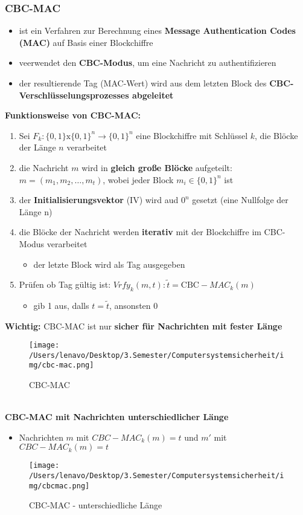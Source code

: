 \documentclass[a4paper, 10pt]{article}
\begin{document}
\subsubsection{CBC-MAC}
\begin{itemize}
    \item ist ein Verfahren zur Berechnung eines \textbf{Message Authentication Codes (MAC)} auf Basis einer Blockchiffre
    \item veerwendet den \textbf{CBC-Modus}, um eine Nachricht zu authentifizieren
    \item der resultierende Tag (MAC-Wert) wird aus dem letzten Block des \textbf{CBC-Verschlüsselungsprozesses abgeleitet}
\end{itemize}
\textbf{Funktionsweise von CBC-MAC:}
\begin{enumerate}
    \item Sei $F_k: \{0,1\} \text{x} \{0,1\}^n \longrightarrow \{0,1\}^n$ eine Blockchiffre mit Schlüssel $k$, die Blöcke der Länge $n$ verarbeitet 
    \item die Nachricht $m$ wird in \textbf{gleich große Blöcke} aufgeteilt: $m = (m_1, m_2,\dots,m_t)$, wobei jeder Block $m_i \in \{0,1\}^n$ ist
    \item der \textbf{Initialisierungsvektor} (IV) wird aud $0^n$ gesetzt (eine Nullfolge der Länge n)
    \item die Blöcke der Nachricht werden \textbf{iterativ} mit der Blockchiffre im CBC-Modus verarbeitet
    \begin{itemize}
        \item der letzte Block wird als Tag ausgegeben
    \end{itemize}
    \item Prüfen ob Tag gültig ist: $ Vrfy_k (m,t): \tilde{t}  = \text{CBC} - MAC_k (m)$
    \begin{itemize}
        \item gib 1 aus, dalls $t = \tilde{t}$, ansonsten 0
    \end{itemize}
\end{enumerate}
\textbf{Wichtig:} CBC-MAC ist nur \textbf{sicher für Nachrichten mit fester Länge}
\begin{figure}[h]
    \centering
    \texttt{[image: /Users/lenavo/Desktop/3.Semester/Computersystemsicherheit/img/cbc-mac.png]}
    \caption{CBC-MAC}
    \label{fig:enter-label}
\end{figure}\\
\textbf{CBC-MAC mit Nachrichten unterschiedlicher Länge}
\begin{itemize}
    \item Nachrichten $m$ mit $CBC-MAC_k(m) = t$ und $m'$ mit $CBC-MAC_k(m) = t$
\end{itemize}
\begin{figure}[h]
    \centering
    \texttt{[image: /Users/lenavo/Desktop/3.Semester/Computersystemsicherheit/img/cbcmac.png]}
    \caption{CBC-MAC - unterschiedliche Länge}
    \label{fig:enter-label}
\end{figure}
\end{document}
